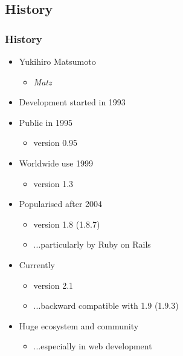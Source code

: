 \subsection{History}
\begin{frame}\frametitle{History}

\begin{itemize}

\item<1-> Yukihiro Matsumoto
\begin{itemize}
\item \textit{Matz}
\end{itemize}

\item<2-> Development started in 1993

\item<3-> Public in 1995
\begin{itemize}
\item version 0.95
\end{itemize}

\item<4-> Worldwide use 1999
\begin{itemize}
\item version 1.3
\end{itemize}

\item<5-> Popularised after 2004
\begin{itemize}
\item version 1.8 (1.8.7)
\item ...particularly by Ruby on Rails
\end{itemize}

\item<6-> Currently
\begin{itemize}
\item version 2.1
\item ...backward compatible with 1.9 (1.9.3)
\end{itemize}

\item<7-> Huge ecosystem and community
\begin{itemize}
\item ...especially in web development
\end{itemize}

\end{itemize} 

\end{frame}




